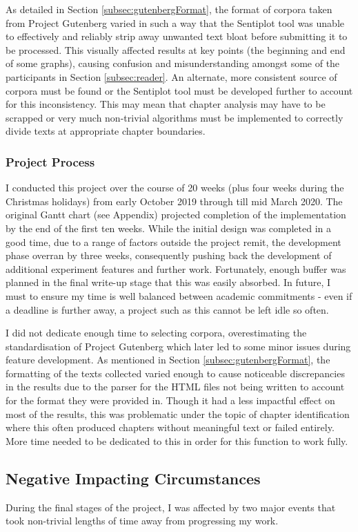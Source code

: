 \documentclass{article}
\begin{document}
{            As detailed in Section \ref{subsec:gutenbergFormat}, the format of corpora taken from Project Gutenberg varied in such a way that the Sentiplot tool was unable to effectively and reliably strip away unwanted text bloat before submitting it to be processed. This visually affected results at key points (the beginning and end of some graphs), causing confusion and misunderstanding amongst some of the participants in Section \ref{subsec:reader}. An alternate, more consistent source of corpora must be found or the Sentiplot tool must be developed further to account for this inconsistency. This may mean that chapter analysis may have to be scrapped or very much non-trivial algorithms must be implemented to correctly divide texts at appropriate chapter boundaries.
        \subsubsection{Project Process}
            I conducted this project over the course of 20 weeks (plus four weeks during the Christmas holidays) from early October 2019 through till mid March 2020. The original Gantt chart (see Appendix) projected completion of the implementation by the end of the first ten weeks. While the initial design was completed in a good time, due to a range of factors outside the project remit, the development phase overran by three weeks, consequently pushing back the development of additional experiment features and further work. Fortunately, enough buffer was planned in the final write-up stage that this was easily absorbed. In future, I must to ensure my time is well balanced between academic commitments - even if a deadline is further away, a project such as this cannot be left idle so often.

            I did not dedicate enough time to selecting corpora, overestimating the standardisation of Project Gutenberg which later led to some minor issues during feature development. As mentioned in Section \ref{subsec:gutenbergFormat}, the formatting of the texts collected varied enough to cause noticeable discrepancies in the results due to the parser for the HTML files not being written to account for the format they were provided in. Though it had a less impactful effect on most of the results, this was problematic under the topic of chapter identification where this often produced chapters without meaningful text or failed entirely. More time needed to be dedicated to this in order for this function to work fully.
    \subsection{Negative Impacting Circumstances}
        During the final stages of the project, I was affected by two major events that took non-trivial lengths of time away from progressing my work.

}
\end{document}

